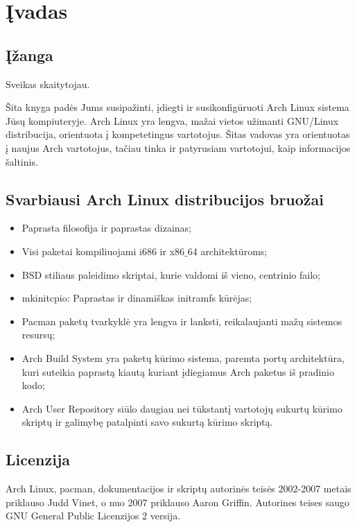\chapter{Įvadas}

  \section{Įžanga}

  Sveikas skaitytojau. 

  Šita knyga padės Jums susipažinti, įdiegti ir susikonfigūruoti
  Arch Linux sistema Jūsų kompiuteryje. Arch Linux yra lengva, mažai
  vietos užimanti GNU/Linux distribucija, orientuota į kompetetingus
  vartotojus. Šitas vadovas yra orientuotas į naujus Arch vartotojus,
  tačiau tinka ir patyrusiam vartotojui, kaip informacijos šaltinis.

  \section{Svarbiausi Arch Linux distribucijos bruožai}
  \begin{itemize}
    \item Paprasta filosofija ir paprastas dizainas;
    \item Visi paketai kompiliuojami i686 ir x86$\_$64 architektūroms;
    \item BSD stiliaus paleidimo skriptai, kurie valdomi iš vieno, centrinio failo;
    \item mkinitcpio: Paprastas ir dinamiškas initramfs kūrėjas;
    \item Pacman paketų tvarkyklė yra lengva ir lanksti, reikalaujanti mažų sistemos resursų;
    \item Arch Build System yra paketų kūrimo sistema, paremta portų
      architektūra, kuri suteikia paprastą kiautą kuriant įdiegiamus Arch
      paketus iš pradinio kodo;
    \item Arch User Repository siūlo daugiau nei tūkstantį vartotojų sukurtų
      kūrimo skriptų ir galimybę patalpinti savo sukurtą kūrimo
      skriptą.
  \end{itemize}

  \section{Licenzija}

  Arch Linux, pacman, dokumentacijos ir skriptų autorinės teisės
  2002-2007 metais priklauso Judd Vinet, o nuo 2007 priklauso Aaron
  Griffin. Autorines teises saugo GNU General Public Licenzijos 2
  versija.

